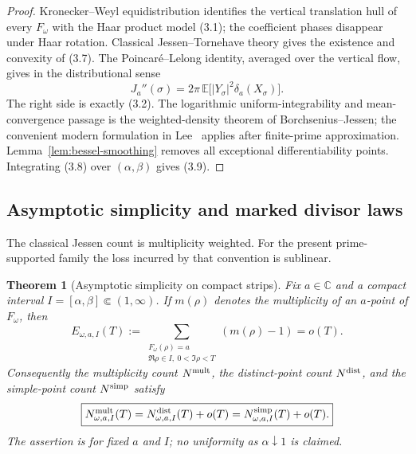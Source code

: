 \documentclass[11pt]{article}
\newtheorem{theorem}{Theorem}[section]
\theoremstyle{definition}
\theoremstyle{remark}
\newcommand{\C}{\mathbb C}
\begin{document}
\begin{proof}
Kronecker--Weyl equidistribution identifies the vertical translation hull of every
$F_\omega$ with the Haar product model (3.1); the coefficient phases disappear under
Haar rotation.  Classical Jessen--Tornehave theory gives the existence and convexity
of (3.7).  The Poincar\'e--Lelong identity, averaged over the vertical flow, gives in
the distributional sense
\[
 J_a''(\sigma)=2\pi\,
 \mathbb E\bigl[|Y_\sigma|^2\delta_a(X_\sigma)\bigr].
\]
The right side is exactly (3.2).  The logarithmic uniform-integrability and
mean-convergence passage is the weighted-density theorem of
Borchsenius--Jessen; the convenient modern formulation in
Lee~\cite[Sections 2--3]{Lee2014} applies after finite-prime approximation.
Lemma~\ref{lem:bessel-smoothing} removes all exceptional differentiability points.
Integrating (3.8) over $(\alpha,\beta)$ gives (3.9).
\end{proof}

\subsection{Asymptotic simplicity and marked divisor laws}

The classical Jessen count is multiplicity weighted.  For the present prime-supported
family the loss incurred by that convention is sublinear.

\begin{theorem}[Asymptotic simplicity on compact strips]
\label{thm:asymptotic-simplicity}
Fix $a\in\C$ and a compact interval $I=[\alpha,\beta]\Subset(1,\infty)$.  If
$m(\rho)$ denotes the multiplicity of an $a$-point of $F_\omega$, then
\[
 E_{\omega,a,I}(T):=
 \sum_{\substack{F_\omega(\rho)=a\\
 \Re\rho\in I,\ 0<\Im\rho<T}}(m(\rho)-1)=o(T).
\]
Consequently the multiplicity count $N^{\rm mult}$, the distinct-point count
$N^{\rm dist}$, and the simple-point count $N^{\rm simp}$ satisfy
\[
 \boxed{
 N^{\rm mult}_{\omega,a,I}(T)
 =N^{\rm dist}_{\omega,a,I}(T)+o(T)
 =N^{\rm simp}_{\omega,a,I}(T)+o(T).
 }
\]
The assertion is for fixed $a$ and $I$; no uniformity as $\alpha\downarrow1$ is
claimed.
\end{theorem}
\end{document}
